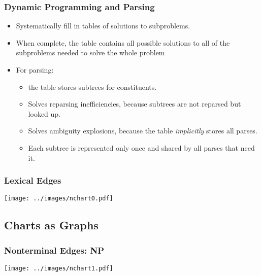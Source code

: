 \begin{frame}[fragile]
  \frametitle{Dynamic Programming and Parsing}


  \begin{itemize}
    
  \item Systematically fill in tables of solutions to subproblems.
    
    
  \item When complete, the table contains all possible solutions to all of
    the subproblems needed to solve the whole problem
    
    
  \item For parsing:

    \begin{itemize}
    \item the table stores subtrees for constituents.
    
    
    \item Solves reparsing inefficiencies, because subtrees are not
      reparsed but looked up.
    
    
    \item Solves ambiguity explosions, because the table
      \emph{implicitly} stores all parses.
 
    \item Each subtree is represented only once and shared by all parses
      that need it.
  \end{itemize}
\end{itemize}

\end{frame}







\begin{frame}[fragile]
\frametitle{Lexical Edges}


\begin{center}
\texttt{[image: ../images/nchart0.pdf]}  
\end{center}
\end{frame}

\subsection{Charts as Graphs}

\begin{frame}[fragile]
\frametitle{Nonterminal Edges: NP}

\begin{center}
\texttt{[image: ../images/nchart1.pdf]}  
\end{center}

\end{frame}

